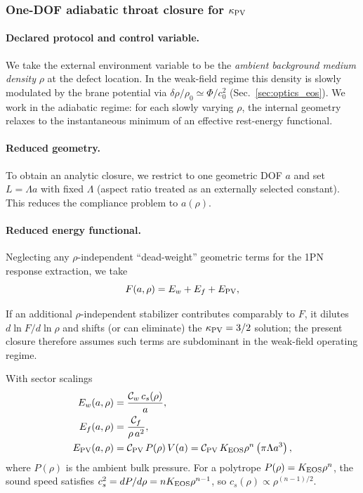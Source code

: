 \documentclass[11pt]{article}
\begin{document}
\subsubsection{One-DOF adiabatic throat closure for \texorpdfstring{$\kappa_{\rm PV}$}{kappaPV}}
\label{sec:kappaPV:adiabatic1dof}

\paragraph{Declared protocol and control variable.}
We take the external environment variable to be the \emph{ambient background medium density} \(\rho\) at the
defect location. In the weak-field regime this density is slowly modulated by the brane potential via
\(\delta\rho/\rho_0 \simeq \Phi/c_0^2\) (Sec.~\ref{sec:optics_eos}). We work in the adiabatic regime:
for each slowly varying \(\rho\), the internal geometry relaxes to the instantaneous minimum of an effective
rest-energy functional.

\paragraph{Reduced geometry.}
To obtain an analytic closure, we restrict to one geometric DOF \(a\) and set \(L=\Lambda a\) with fixed
\(\Lambda\) (aspect ratio treated as an externally selected constant). This reduces the compliance problem
to \(a(\rho)\).

\paragraph{Reduced energy functional.}
Neglecting any \(\rho\)-independent ``dead-weight'' geometric terms for the 1PN response extraction, we take
\begin{equation}
F(a,\rho)=E_w+E_f+E_{\rm PV},
\label{eq:kappaPV_closure_F}
\end{equation}

If an additional \(\rho\)-independent stabilizer contributes comparably to \(F\), it dilutes
\(d\ln F/d\ln\rho\) and shifts (or can eliminate) the \(\kappa_{\rm PV}=3/2\) solution; the present closure
therefore assumes such terms are subdominant in the weak-field operating regime.

With sector scalings
\begin{align}
E_w(a,\rho) &= \frac{\mathcal{C}_w\,c_s(\rho)}{a},
\label{eq:kappaPV_closure_Ew}\\
E_f(a,\rho) &= \frac{\mathcal{C}_f}{\rho\,a^2},
\label{eq:kappaPV_closure_Ef}\\
E_{\rm PV}(a,\rho) &= \mathcal{C}_{\rm PV}\,P(\rho)\,V(a)
= \mathcal{C}_{\rm PV}\,K_{\rm EOS}\rho^n\left(\pi\Lambda a^3\right),
\label{eq:kappaPV_closure_Epv}
\end{align}
where \(P(\rho)\) is the ambient bulk pressure. For a polytrope \(P(\rho)=K_{\rm EOS}\rho^n\), the sound
speed satisfies \(c_s^2=dP/d\rho=nK_{\rm EOS}\rho^{n-1}\), so \(c_s(\rho)\propto\rho^{(n-1)/2}\).
\end{document}
